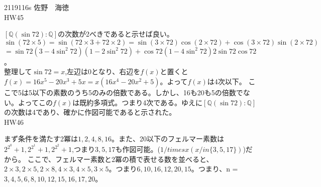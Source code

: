 \documentclass[11pt]{jsarticle}
\begin{document}
2119116s 佐野　海徳\\
HW45
\par $\left[\mathbb{Q}(\sin72):\mathbb{Q}\right]$の次数が2べきであると示せば良い。$\sin(72 \times 5) = \sin(72 \times 3 + 72 \times 2) = \sin(3 \times 72)\cos(2 \times 72) + \cos(3\times72) \sin(2 \times 72)$\\
$ = \sin72(3 - 4\sin^2 72)(1 - 2\sin^2 72) + \cos72(1 - 4\sin^2 72)2\sin 72 \cos 72$。\\
整理して$\sin72 = x$,左辺は0となり、右辺を$f(x)$と置くと$f(x) = 16x^5 - 20x^3 + 5x = x(16x^4 - 20x^2 + 5)$。よって$f(x)$は4次以下。
ここで5は5以下の素数のうち5のみの倍数である。しかし、16も20も5の倍数でない。よってこの$f(x)$は既約多項式。つまり4次である。ゆえに$\left[\mathbb{Q}(\sin 72):\mathbb{Q}\right]$の次数は4であり、確かに作図可能であると示された。
\\HW46
\par まず条件を満たす2冪は$1,2,4,8,16$。また、20以下のフェルマー素数は$2^{2^0} + 1,2^{2^1} + 1,2^{2^2} + 1$,つまり$3,5,17$も作図可能。($1 /times x(x /in \{3,5,17\})$)だから。
ここで、フェルマー素数と2冪の積で表せる数を並べると、$2 \times 3,2\times 5,2 \times 8,4 \times 3,4 \times 5,3 \times 5$。つまり$6,10,16,12,20,15$。つまり、n = $3,4,5,6,8,10,12,15,16,17,20$。
\end{document}
